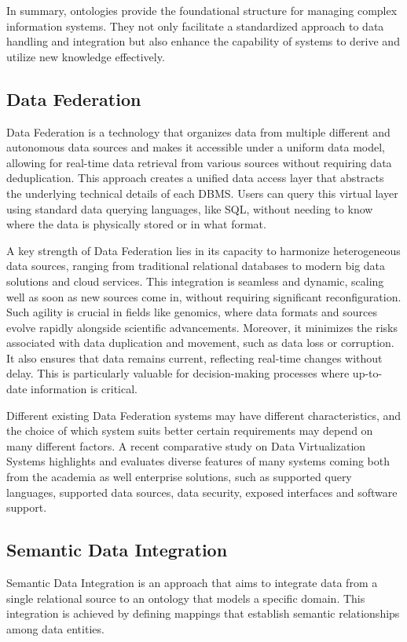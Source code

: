 In summary, ontologies provide the foundational structure for managing complex information systems. They not only facilitate a standardized approach to data handling and integration but also enhance the capability of systems to derive and utilize new knowledge effectively.

\subsection{Data Federation} \label{DF}
Data Federation is a technology that organizes data from multiple different and autonomous data sources and makes it accessible under a uniform data model, allowing for real-time data retrieval from various sources without requiring data deduplication. This approach creates a unified data access layer that abstracts the underlying technical details of each \ac{DBMS}. Users can query this virtual layer using standard data querying languages, like \ac{SQL}, without needing to know where the data is physically stored or in what format.

A key strength of Data Federation lies in its capacity to harmonize heterogeneous data sources, ranging from traditional relational databases to modern big data solutions and cloud services. This integration is seamless and dynamic, scaling well as soon as new sources come in, without requiring significant reconfiguration. Such agility is crucial in fields like genomics, where data formats and sources evolve rapidly alongside scientific advancements. Moreover, it minimizes the risks associated with data duplication and movement, such as data loss or corruption. It also ensures that data remains current, reflecting real-time changes without delay. This is particularly valuable for decision-making processes where up-to-date information is critical.

Different existing Data Federation systems may have different characteristics, and the choice of which system suits better certain requirements may depend on many different factors. A recent comparative study on Data Virtualization Systems \cite{DBLP:journals/semweb/GuCLMXXC24} highlights and evaluates diverse features of many systems coming both from the academia as well enterprise solutions, such as supported query languages, supported data sources, data security, exposed interfaces and software support.

\subsection{Semantic Data Integration}
Semantic Data Integration is an approach that aims to integrate data from a single relational source to an ontology that models a specific domain. This integration is achieved by defining mappings that establish semantic relationships among data entities.

